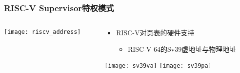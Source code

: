 \begin{frame}   
	\frametitle{RISC-V Supervisor特权模式}
	
	\begin{columns}[t]
		
		\begin{column}{.4\textwidth}
			
			\texttt{[image: riscv\_address]}
			
		\end{column}
		
		
		\begin{column}{.6\textwidth}
			
			\begin{itemize}\large
				\item RISC-V对页表的硬件支持
				\begin{itemize}
					\item RISC-V 64的Sv39虚地址与物理地址
					
					
				\end{itemize}
			\end{itemize}
			
			\texttt{[image: sv39va]} \pause
			\texttt{[image: sv39pa]}
			
		\end{column}
		
		
	\end{columns}
	
\end{frame}


